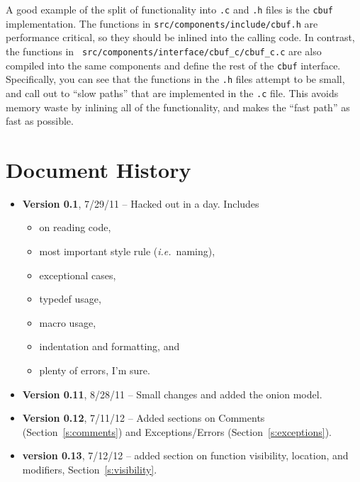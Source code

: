 \documentclass[11pt,onecolumn]{article}
\def\composite{\textsc{Composite}}
\def\ie{\textit{i.e.}}
\newcommand{\head}[1]{\vspace{0.4em}\noindent{\bf #1}}
\newcommand{\lsthead}[1]{{\bf #1}}
\begin{document}
\head{Example.}  A good example of the split of functionality into
     {\tt .c} and {\tt .h} files is the {\tt cbuf} implementation.
     The functions in {\tt src/components/include/cbuf.h} are
     performance critical, so they should be inlined into the calling
     code.  In contrast, the functions in {\tt
       src/components/interface/cbuf\_c/cbuf\_c.c} are also compiled
     into the same components and define the rest of the {\tt cbuf}
     interface.  Specifically, you can see that the functions in the
     {\tt .h} files attempt to be small, and call out to ``slow
     paths'' that are implemented in the {\tt .c} file.  This avoids
     memory waste by inlining all of the functionality, and makes the
     ``fast path'' as fast as possible.






\section{Document History}
\label{s:hist}

\begin{itemize}
\item \lsthead{Version 0.1}, 7/29/11 -- Hacked out in a day.  Includes
\begin{itemize}[itemsep=0pt,topsep=1pt,parsep=1pt,leftmargin=2.5em]
\item on reading code,
\item most important style rule (\ie\ naming),
\item exceptional cases,
\item typedef usage,
\item macro usage,
\item indentation and formatting, and
\item plenty of errors, I'm sure.
\end{itemize}
\item \lsthead{Version 0.11}, 8/28/11 -- Small changes and added the
  onion model.
\item \lsthead{Version 0.12}, 7/11/12 -- Added sections on Comments
  (Section~\ref{s:comments}) and Exceptions/Errors
  (Section~\ref{s:exceptions}).
\item \lsthead{version 0.13}, 7/12/12 -- added section on function
  visibility, location, and modifiers, Section~\ref{s:visibility}.
\end{itemize}
\end{document}
